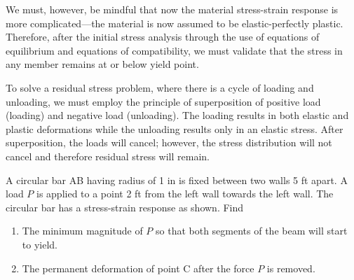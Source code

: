 \documentclass[
10pt,
a4paper,
openany,
svgnames,
]{book} %
\begin{document}
We must, however, be mindful that now the material stress-strain response is more complicated—the material is now assumed to be elastic-perfectly plastic. Therefore, after the initial stress analysis through the use of equations of equilibrium and equations of compatibility, we must validate that the stress in any member remains at or below yield point.

To solve a residual stress problem, where there is a cycle of loading and unloading, we must employ the principle of superposition of positive load (loading) and negative load (unloading). The loading results in both elastic and plastic deformations while the unloading results only in an elastic stress. After superposition, the loads will cancel; however, the stress distribution will not cancel and therefore residual stress will remain.

\begin{example}

  A circular bar AB having radius of 1 in is fixed between two walls 5 ft apart. A load $P$ is applied to a point 2 ft from the left wall towards the left wall. The circular bar has a stress-strain response as shown. Find
  \begin{enumerate}
  \item The minimum magnitude of $P$ so that both segments of the beam will start to yield.
  \item The permanent deformation of point C after the force $P$ is removed.
  \end{enumerate}

\end{example}
\end{document}
